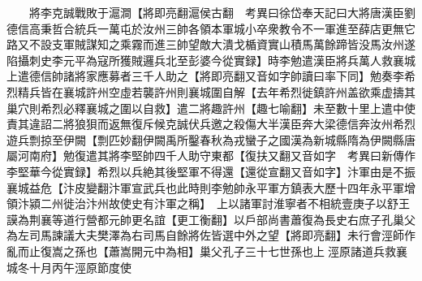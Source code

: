 　　將李克誠戰敗于滬澗【將即亮翻滬侯古翻　考異曰徐岱奉天記曰大將唐漢臣劉德信高秉哲合統兵一萬屯於汝州三帥各領本軍城小卒衆教令不一軍進至薛店更無它路又不設支軍賊謀知之乘霧而進三帥望敵大潰戈楯資實山積馬萬餘蹄皆没馬汝州遂陷攝刺史李元平為寇所獲賊邏兵北至彭婆今從實録】時李勉遣漢臣將兵萬人救襄城上遣德信帥諸將家應募者三千人助之【將即亮翻又音如字帥讀曰率下同】勉奏李希烈精兵皆在襄城許州空虛若襲許州則襄城圍自解【去年希烈徙鎮許州盖欲乘虚擣其巢穴則希烈必釋襄城之圍以自救】遣二將趣許州【趣七喻翻】未至數十里上遣中使責其違詔二將狼狽而返無復斥候克誠伏兵邀之殺傷大半漢臣奔大梁德信奔汝州希烈遊兵剽掠至伊闕【剽匹妙翻伊闕禹所鑿春秋為戎蠻子之國漢為新城縣隋為伊闕縣唐屬河南府】勉復遣其將李堅帥四千人助守東都【復扶又翻又音如字　考異曰新傳作李堅華今從實録】希烈以兵絶其後堅軍不得還【還從宣翻又音如字】汴軍由是不振襄城益危【汴皮變翻汴軍宣武兵也此時則李勉帥永平軍方鎮表大歷十四年永平軍增領汴潁二州徙治汴州故使史有汴軍之稱】　上以諸軍討淮寧者不相統壹庚子以舒王謨為荆襄等道行營都元帥更名誼【更工衡翻】以戶部尚書蕭復為長史右庶子孔巢父為左司馬諫議大夫樊澤為右司馬自餘將佐皆選中外之望【將即亮翻】未行會涇師作亂而止復嵩之孫也【蕭嵩開元中為相】巢父孔子三十七世孫也上涇原諸道兵救襄城冬十月丙午涇原節度使

